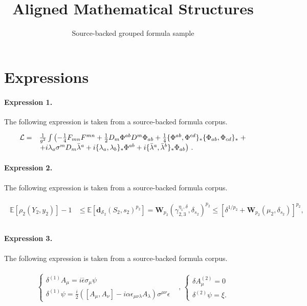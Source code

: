 \documentclass[11pt]{article}
\title{Aligned Mathematical Structures}
\author{Source-backed grouped formula sample}
\date{}
\begin{document}
\maketitle
\section{Expressions}
\paragraph{Expression 1.} The following expression is taken from a source-backed formula corpus.

\begin{align*}\begin{array}{rl}{\cal L} =& \frac{1}{g^2}\int \left( -\frac{1}{4} F_{mn} F^{mn} + \frac{1}{2}D_m\Phi^{ab} D^m \Phi_{ab} +\frac{1}{4} \{\Phi^{ab},\Phi^{cd}\}_* \{\Phi_{ab},\Phi_{cd}\}_*\right.+\\&\left. + i \lambda_a \sigma^m D_m\bar{\lambda}^a +i\{\lambda_a,\lambda_b\}_* \Phi^{ab}+i\{\bar\lambda^a,\bar\lambda^b\}_* \Phi_{ab}\right)\,.\end{array}\end{align*}

\paragraph{Expression 2.} The following expression is taken from a source-backed formula corpus.

\begin{align*}\begin{aligned}\mathbb{E} \left[ \rho_2 (Y_2, y_2) \right] - 1 & \leq \mathbb{E} \left[ \boldsymbol{d}_{\mathcal{S}_2 } (S_2, s_2)^{p_2} \right] = \boldsymbol{W}_{p_2} \left(\gamma_{2,3}^{\eta_1, \delta}, \delta_{s_2 } \right)^{p_2} \leq \left[ \delta^{1/p_2} + \boldsymbol{W}_{p_2} \left(\mu_2 , \delta_{s_2} \right) \right]^{p_2} ,\\\end{aligned}\end{align*}

\paragraph{Expression 3.} The following expression is taken from a source-backed formula corpus.

\begin{align*}\begin{array}{cc}\left\{\begin{array}{l}\delta^{(1)} A_{\mu} =i \bar{\epsilon}\sigma_{\mu}\psi \\\delta^{(1)} \psi =\frac{i}{2}([A_{\mu} ,A_{\nu} ] -i\alpha\epsilon_{\mu\nu\lambda}A_{\lambda})\sigma^{\mu\nu}\epsilon\end{array}\right.&\text{, } \left\{\begin{array}{l}\delta A_{\mu}^{(2)} =0 \\\delta ^{(2)}\psi =\xi. \end{array} \right.\end{array}\end{align*}
\end{document}
